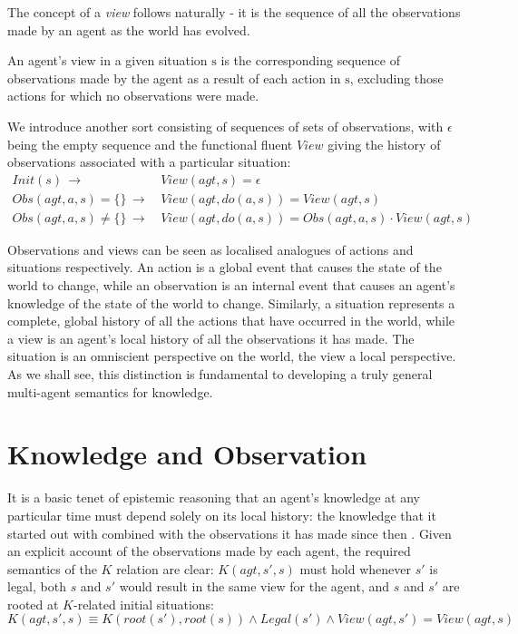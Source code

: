 The concept of a \emph{view} follows naturally - it is the sequence
of all the observations made by an agent as the world has evolved.

\begin{defnL}
[{Views}] An agent's view in a given situation $\mathrm{s}$
is the corresponding sequence of observations made by the agent as
a result of each action in $\mathrm{s}$, excluding those actions
for which no observations were made. 
\end{defnL}
We introduce another sort  consisting of sequences of
sets of observations, with $\epsilon$ being the empty sequence and
the functional fluent $View$ giving the history of observations associated
with a particular situation:\begin{align}
Init(s)\,\rightarrow & \, View(agt,s)=\epsilon\nonumber \\
Obs(agt,a,s)=\{\}\,\rightarrow & \, View(agt,do(a,s))=View(agt,s)\nonumber \\
Obs(agt,a,s)\neq\{\}\,\rightarrow & \, View(agt,do(a,s))=Obs(agt,a,s)\cdot View(agt,s)\label{eq:view_defn}\end{align}


Observations and views can be seen as localised analogues of actions
and situations respectively. An action is a global event that causes
the state of the world to change, while an observation is an internal
event that causes an agent's knowledge of the state of the world to
change. Similarly, a situation represents a complete, global history
of all the actions that have occurred in the world, while a view is
an agent's local history of all the observations it has made. The
situation is an omniscient perspective on the world, the view a local
perspective. As we shall see, this distinction is fundamental to developing
a truly general multi-agent semantics for knowledge.


\section{Knowledge and Observation\label{sub:Knowledge-and-Observation}}

It is a basic tenet of epistemic reasoning that an agent's knowledge
at any particular time must depend solely on its local history: the
knowledge that it started out with combined with the observations
it has made since then \citep{halpern90knowledge_distrib}. Given
an explicit account of the observations made by each agent, the required
semantics of the $K$ relation are clear: $K(agt,s',s)$ must hold
whenever $s'$ is legal, both $s$ and $s'$ would result in the same
view for the agent, and $s$ and $s'$ are rooted at $K$-related
initial situations:\begin{equation}
K(agt,s',s)\equiv K(root(s'),root(s))\wedge Legal(s')\wedge View(agt,s')=View(agt,s)\label{eq:k-desired}\end{equation}


